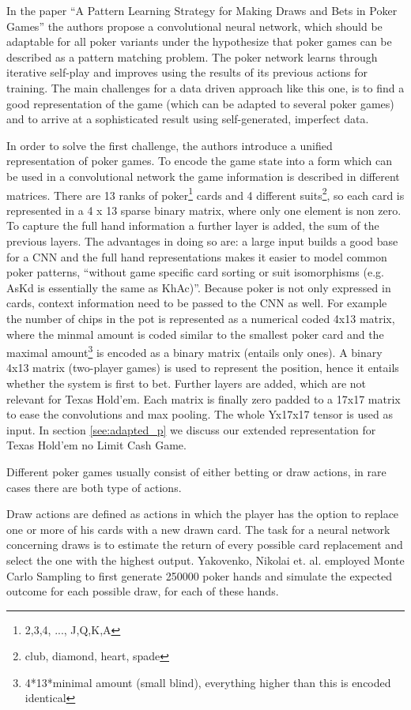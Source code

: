 \documentclass[]{report}
\begin{document}
In the paper ``A Pattern Learning Strategy for Making Draws and Bets
in Poker Games''\cite{1} the authors propose a convolutional neural
network, which should be adaptable for all poker variants under the
hypothesize that poker games can be described as a pattern matching
problem. The poker network learns through iterative self-play and
improves using the results of its previous actions for training. The
main challenges for a data driven approach like this one, is to find
a good representation of the game (which can be adapted to several
poker games) and to arrive at a sophisticated result using self-generated,
imperfect data.

In order to solve the first challenge, the authors introduce a unified
representation of poker games. To encode the game state into a form
which can be used in a convolutional network the game information
is described in different matrices. There are 13 ranks of poker\footnote{2,3,4, ..., J,Q,K,A}
cards and 4 different suits\footnote{club, diamond, heart, spade},
so each card is represented in a 4 x 13 sparse binary matrix, where
only one element is non zero. To capture the full hand information
a further layer is added, the sum of the previous layers. The advantages
in doing so are: a large input builds a good base for a CNN and the
full hand representations makes it easier to model common poker patterns,
``without game specific card sorting or suit isomorphisms (e.g. AsKd
is essentially the same as KhAc)''.\cite{1} Because poker is not
only expressed in cards, context information need to be passed to
the CNN as well. For example the number of chips in the pot is represented
as a numerical coded 4x13 matrix, where the minmal amount is coded
similar to the smallest poker card and the maximal amount\footnote{4{*}13{*}minimal amount (small blind), everything higher than this
is encoded identical} is encoded as a binary matrix (entails only ones). A binary 4x13
matrix (two-player games) is used to represent the position, hence
it entails whether the system is first to bet. Further layers are
added, which are not relevant for Texas Hold'em. Each matrix is finally
zero padded to a 17x17 matrix to ease the convolutions and max pooling.
The whole Yx17x17 tensor is used as input. In section \ref{see:adapted_p}
we discuss our extended representation for Texas Hold'em no Limit
Cash Game.

Different poker games usually consist of either betting or draw actions,
in rare cases there are both type of actions. 

Draw actions are defined as actions in which the player has the option
to replace one or more of his cards with a new drawn card. The task
for a neural network concerning draws is to estimate the return of
every possible card replacement and select the one with the highest
output. Yakovenko, Nikolai et. al. employed Monte Carlo Sampling to
first generate 250000 poker hands and simulate the expected outcome
for each possible draw, for each of these hands.
\end{document}

